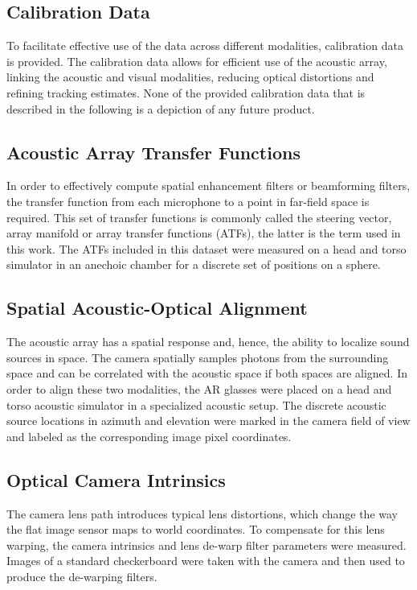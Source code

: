 \documentclass[journal]{IEEEtran}
\begin{document}
\begin{table*}[htb!]
\begin{center}
\begin{tabular}
{{\section{Calibration Data} \label{appx:CalibrationData}
To facilitate effective use of the data across different modalities, calibration data is provided.
The calibration data allows for efficient use of the acoustic array, linking the acoustic and visual modalities, reducing optical distortions and refining tracking estimates.
None of the provided calibration data that is described in the following is a depiction of any future product.

\subsection{Acoustic Array Transfer Functions}
In order to effectively compute spatial enhancement filters or beamforming filters, the transfer function from each microphone to a point in far-field space is required.
This set of transfer functions is commonly called the steering vector, array manifold or array transfer functions (ATFs), the latter is the term used in this work.
The ATFs included in this dataset were measured on a head and torso simulator in an anechoic chamber for a discrete set of positions on a sphere.


\subsection{Spatial Acoustic-Optical Alignment}
The acoustic array has a spatial response and, hence, the ability to localize sound sources in space.
The camera spatially samples photons from the surrounding space and can be correlated with the acoustic space if both spaces are aligned.
In order to align these two modalities, the AR glasses were placed on a head and torso acoustic simulator in a specialized acoustic setup.
The discrete acoustic source locations in azimuth and elevation were marked in the camera field of view and labeled as the corresponding image pixel coordinates.



\subsection{Optical Camera Intrinsics}
The camera lens path introduces typical lens distortions, which change the way the flat image sensor maps to world coordinates.
To compensate for this lens warping, the camera intrinsics and lens de-warp filter parameters were measured.
Images of a standard checkerboard were taken with the camera and then used to produce the de-warping filters.

}}
\end{tabular}
\end{center}
\end{table*}
\end{document}
